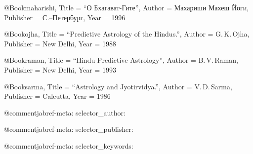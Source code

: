 
@Book{maharishi,
  Title                    = {``О Бхагават-Гите''},
  Author                   = {Махариши Махеш Йоги},
  Publisher                = {С.--Петербург},
  Year                     = {1996}
}

@Book{ojha,
  Title                    = {``Predictive Astrology of the Hindus.''},
  Author                   = {G.\,K.\,Ojha},
  Publisher                = {New Delhi},
  Year                     = {1988}
}

@Book{raman,
  Title                    = {``Hindu Predictive Astrology''},
  Author                   = {B.\,V.\,Raman},
  Publisher                = {New Delhi},
  Year                     = {1993}
}

@Book{sarma,
  Title                    = {``Astrology and Jyotirvidya.''},
  Author                   = {V.\,D.\,Sarma},
  Publisher                = {Calcutta},
  Year                     = {1986}
}


@comment{jabref-meta: selector_author:}

@comment{jabref-meta: selector_publisher:}

@comment{jabref-meta: selector_keywords:}

